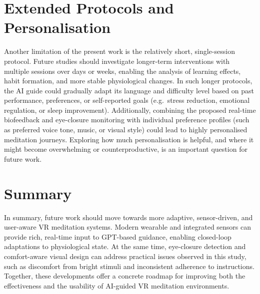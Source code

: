\section{Extended Protocols and Personalisation}

Another limitation of the present work is the relatively short, single-session
protocol. Future studies should investigate longer-term interventions with
multiple sessions over days or weeks, enabling the analysis of learning
effects, habit formation, and more stable physiological changes. In such
longer protocols, the AI guide could gradually adapt its language and
difficulty level based on past performance, preferences, or self-reported
goals (e.g.\ stress reduction, emotional regulation, or sleep improvement).
Additionally, combining the proposed real-time biofeedback and eye-closure
monitoring with individual preference profiles (such as preferred voice tone,
music, or visual style) could lead to highly personalised meditation journeys.
Exploring how much personalisation is helpful, and where it might become
overwhelming or counterproductive, is an important question for future work.

\section*{Summary}
In summary, future work should move towards more adaptive, sensor-driven, and
user-aware VR meditation systems. Modern wearable and integrated sensors can
provide rich, real-time input to GPT-based guidance, enabling closed-loop
adaptations to physiological state. At the same time, eye-closure detection
and comfort-aware visual design can address practical issues observed in this
study, such as discomfort from bright stimuli and inconsistent adherence to
instructions. Together, these developments offer a concrete roadmap for
improving both the effectiveness and the usability of AI-guided VR meditation
environments.
